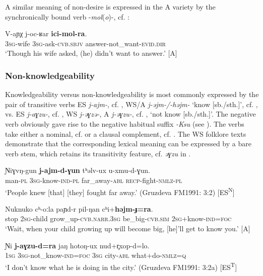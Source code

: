 \documentclass[output=paper,colorlinks,citecolor=brown]{langscibook}
\begin{document}
A similar meaning of non-desire is expressed in the A variety by the synchronically bound verb -\textit{mol}(\textit{o})-, cf. :

\ea\label{ex:niv:87}
    \gll V-aɲχ j-oc-ʁar \textbf{ici-mol-ra}. \\ 
         \textsc{3sg-}wife \textsc{3sg-}ask-\textsc{cvb.sbjv} answer-not\_want-\textsc{evid.dir} \\
    \glt ‘Though his wife asked, (he) didn’t want to answer.’ \citep[162]{Panfilov1965} [A]
\z 

\subsubsection{Non-knowledgeability}

Knowledgeability versus non-knowledgeability is most commonly expressed by the pair of transitive verbs ES \textit{j-ajm-}, cf. , WS/A \textit{j-əjm-/-həjm-} ‘know [sb./sth.]’, cf. , vs. ES \textit{j-aɣzu-}, cf. , WS \textit{j-əɣzə-}, A \textit{j-əɣzu-}, cf. , ‘not know [sb./sth.]’. The negative verb obviously gave rise to the negative habitual suffix \textit{-Ksu} (see ). The verbs take either a nominal, cf.  or a clausal complement, cf. . The WS folklore texts demonstrate that the corresponding lexical meaning can be expressed by a bare verb stem, which retains its transitivity feature, cf. \textit{əɣzu} in .

\ea\label{ex:niv:88}
    \gll Ɲiɣvŋ-gun \textbf{j-ajm-d-ɣun} tʰəlv-ux u-xmu-d-ɣun. \\ 
         man-\textsc{pl} \textsc{3sg}{}-know-\textsc{ind-pl} far\_away-\textsc{abl} \textsc{recp}{}-fight-\textsc{nmlz-pl} \\
    \glt ‘People knew [that] [they] fought far away.’ (Gruzdeva FM1991: 3:2) [ES\textsuperscript{N}]
\z 

\ea\label{ex:niv:89}
    \gll Nuknuko cʰ-oːla paɲd-r pil-ŋan cʰi+\textbf{həjm-ɟ=ra}.\\ 
          stop \textsc{2sg}{}-child grow\_up-\textsc{cvb.narr.3sg} be\_big-\textsc{cvb.sim} \textsc{2sg}+know-\textsc{ind=foc}\\
    \glt ‘Wait, when your child growing up will become big, [he]’ll get to know you.’ \citep[228]{Panfilov1965} [A]
\z 

\ea\label{ex:niv:90}
    \gll Ɲi \textbf{j-aɣzu-d=ra} jaŋ hotoŋ-ux nud+r̥xop-d=lo. \\ 
         \textsc{1sg} \textsc{3sg-}not\_know-\textsc{ind=foc} \textsc{3sg} city-\textsc{abl} what+do-\textsc{nmlz}=\textsc{q} \\
    \glt ‘I don’t know what he is doing in the city.’ (Gruzdeva FM1991: 3:2a) [ES\textsuperscript{T}]
\z 
\end{document}
